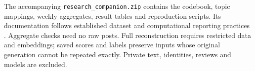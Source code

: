 \documentclass[graybox]{svmult}
\begin{document}
The accompanying \nolinkurl{research_companion.zip} contains the codebook, topic mappings, weekly aggregates, result tables and reproduction scripts. Its documentation follows established dataset and computational reporting practices \cite{datasheets,wilson}. Aggregate checks need no raw posts. Full reconstruction requires restricted data and embeddings; saved scores and labels preserve inputs whose original generation cannot be repeated exactly. Private text, identities, reviews and models are excluded.



\end{document}
